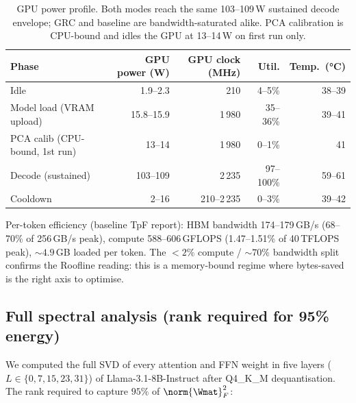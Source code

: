 \documentclass[11pt]{article}
\begin{document}
\begin{table}[h]\centering\footnotesize
\caption{GPU power profile. Both modes reach the same 103--109\,W sustained
decode envelope; GRC and baseline are bandwidth-saturated alike. PCA
calibration is CPU-bound and idles the GPU at 13--14\,W on first run only.}
\begin{tabular}{@{}lrrrr@{}}
\toprule
\textbf{Phase} & \textbf{GPU power (W)} & \textbf{GPU clock (MHz)} & \textbf{Util.} & \textbf{Temp.\ (°C)}\\
\midrule
Idle                       & 1.9--2.3   & 210         & 4--5\%     & 38--39\\
Model load (VRAM upload)   & 15.8--15.9 & 1\,980      & 35--36\%   & 39--41\\
PCA calib (CPU-bound, 1st run)
                           & 13--14     & 1\,980      & 0--1\%     & 41\\
Decode (sustained)         & 103--109   & 2\,235      & 97--100\%  & 59--61\\
Cooldown                   & 2--16      & 210--2\,235 & 0--3\%     & 39--42\\
\bottomrule
\end{tabular}
\end{table}

Per-token efficiency (baseline TpF report): HBM bandwidth
174--179\,GB/s (68--70\% of 256\,GB/s peak), compute 588--606\,GFLOPS
(1.47--1.51\% of 40\,TFLOPS peak), $\sim 4.9$\,GB loaded per token.
The $<\!2\%$ compute / $\sim\!70\%$ bandwidth split confirms the
Roofline reading: this is a memory-bound regime where bytes-saved is the
right axis to optimise.

\subsection{Full spectral analysis (rank required for 95\% energy)}

We computed the full SVD of every attention and FFN weight in five layers
($L\in\{0,7,15,23,31\}$) of Llama-3.1-8B-Instruct after Q4\_K\_M
dequantisation. The rank required to capture $95\%$ of $\norm{\Wmat}_F^2$:
\end{document}
